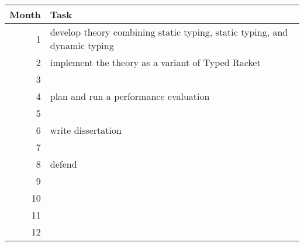 \begin{tabular}{rl}
  Month & Task \\\hline
  1     & develop theory combining \tdeep{} static typing, \tshallow{} static typing, and dynamic typing
  \\
  2     & implement the theory as a variant of Typed Racket
  \\
  3     &
  \\
  4     & plan and run a performance evaluation
  \\
  5     &
  \\
  6     & write dissertation
  \\
  7     &
  \\
  8     & defend
  \\
  9     &
  \\
  10    &
  \\
  11    &
  \\
  12    &
\end{tabular}
